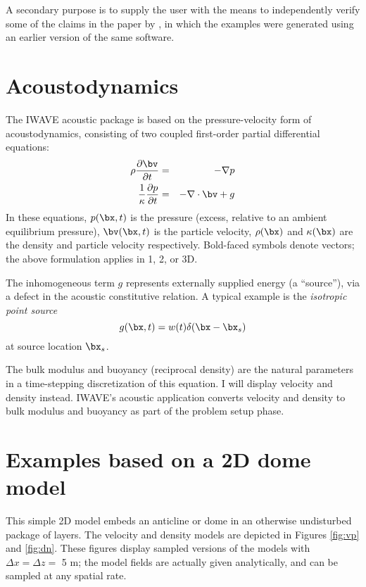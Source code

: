 A secondary purpose is to supply the user with the means to
independently verify some of the claims in the paper by
\cite{SymesVdovina:09}, in which the examples were generated using an
earlier version of the same software.

\section{Acoustodynamics}
The IWAVE acoustic package is based on the pressure-velocity form of
acoustodynamics, consisting of two coupled first-order partial
differential equations:
\begin{eqnarray}
\label{awe}
\rho \frac{\partial \bv}{\partial t} &=& - \nabla p \\
\frac{1}{\kappa}\frac{\partial p}{\partial t} &=& -\nabla \cdot \bv + g
\end{eqnarray}
In these equations, $p(\bx,t)$ is the pressure (excess, relative to an
ambient equilibrium pressure), $\bv(\bx,t)$ is the particle velocity,
$\rho(\bx)$ and $\kappa(\bx)$ are the density and particle velocity
respectively. Bold-faced symbols denote vectors; the above formulation
applies in 1, 2, or 3D.

The inhomogeneous term $g$ represents externally supplied energy (a
``source''), via a defect in the acoustic constitutive relation. A
typical example is the {\em isotropic point source}
\[
g(\bx,t) = w(t) \delta(\bx-\bx_s)
\]
at source location $\bx_s$.

The bulk modulus and buoyancy (reciprocal density) are the natural
parameters in a time-stepping discretization of this equation. I will
display velocity and density instead. IWAVE's acoustic application
converts velocity and density to bulk modulus and buoyancy as part of
the problem setup phase.

\section{Examples based on a 2D dome model}

This simple 2D model embeds an anticline or dome in an otherwise
undisturbed package of layers. The velocity and density models are
depicted in Figures \ref{fig:vp} and \ref{fig:dn}. These
figures display sampled versions of the models with $\Delta x = \Delta
z = $ 5 m; the model fields are actually given analytically, and can
be sampled at any spatial rate.

